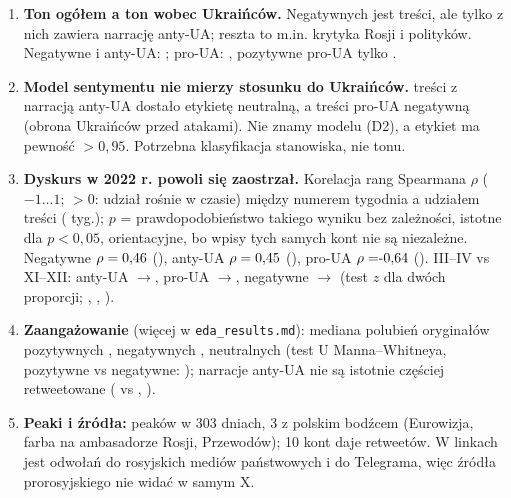 \documentclass[10pt,a4paper]{article}
\begin{document}
\begin{enumerate}[label=\textbf{E\arabic*.}]
\item \textbf{Ton ogółem a ton wobec Ukraińców.} Negatywnych jest \EdaCNeg{} treści, ale tylko \EdaCAntiGivenNeg{} z nich zawiera narrację anty-UA; reszta to m.in. krytyka Rosji i polityków.
Negatywne i anty-UA: \EdaCNegAnti; pro-UA: \EdaCPro, pozytywne pro-UA tylko \EdaCPosPro.
\item \textbf{Model sentymentu nie mierzy stosunku do Ukraińców.} \EdaCNeuGivenAnti{} treści z narracją anty-UA dostało etykietę neutralną, a \EdaCNegGivenPro{} treści pro-UA negatywną (obrona Ukraińców przed atakami).
Nie znamy modelu (D2), a \EdaShareScoreHigh{} etykiet ma pewność $>0{,}95$. Potrzebna klasyfikacja stanowiska, nie tonu.
\item \textbf{Dyskurs w 2022 r. powoli się zaostrzał.} Korelacja rang Spearmana $\rho$ ($-1\ldots1$; $>0$: udział rośnie w czasie) między numerem tygodnia a udziałem treści (\EdaNWeeks{} tyg.);
$p$ = prawdopodobieństwo takiego wyniku bez zależności, istotne dla $p<0{,}05$, orientacyjne, bo wpisy tych samych kont nie są niezależne. Negatywne $\rho=0{,}46$ (\EdaTrNegP), anty-UA $\rho=0{,}45$ (\EdaTrAntiP),
pro-UA $\rho=\EdaTrProRho$ (\EdaTrProP). III--IV vs XI--XII: anty-UA \EdaElAntiA{}$\to$\EdaElAntiB, pro-UA \EdaElProA{}$\to$\EdaElProB, negatywne \EdaElNegA{}$\to$\EdaElNegB{}
(test $z$ dla dwóch proporcji; \EdaElAntiP, \EdaElProP, \EdaElNegP).
\item \textbf{Zaangażowanie} (więcej w \texttt{eda\_results.md}): mediana polubień oryginałów pozytywnych \EdaLikesPos, negatywnych \EdaLikesNeg, neutralnych \EdaLikesNeu{}
(test U Manna--Whitneya, pozytywne vs negatywne: \EdaLikesPosNegP); narracje anty-UA nie są istotnie częściej retweetowane (\EdaRtAnti{} vs \EdaRtNone, \EdaRtAntiP).
\item \textbf{Peaki i źródła:} \EdaNPeaks{} peaków w 303 dniach, 3 z polskim bodźcem (Eurowizja, farba na ambasadorze Rosji, Przewodów); 10 kont daje \EdaTopTenSources{} retweetów.
W linkach jest \EdaNRuDomain{} odwołań do rosyjskich mediów państwowych i \EdaNTme{} do Telegrama, więc źródła prorosyjskiego nie widać w samym X.
\end{enumerate}


\small
\end{document}
